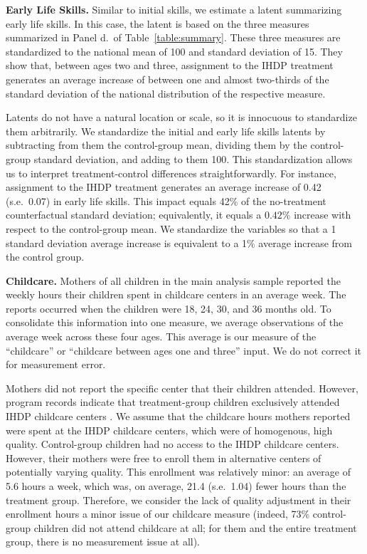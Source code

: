 \noindent \textbf{Early Life Skills.} Similar to initial skills, we estimate a latent summarizing early life skills. In this case, the latent is based on the three measures summarized in Panel d.\ of Table~\ref{table:summary}. These three measures are standardized to the national mean of 100 and standard deviation of 15. They show that, between ages two and three, assignment to the IHDP treatment generates an average increase of between one and almost two-thirds of the standard deviation of the national distribution of the respective measure. 

Latents do not have a natural location or scale, so it is innocuous to standardize them arbitrarily. We standardize the initial and early life skills latents by subtracting from them the control-group mean, dividing them by the control-group standard deviation, and adding to them 100. This standardization allows us to interpret treatment-control differences straightforwardly. For instance, assignment to the IHDP treatment generates an average increase of 0.42 (s.e.\ 0.07) in early life skills. This impact equals 42\% of the no-treatment counterfactual standard deviation; equivalently, it equals a $0.42\%$ increase with respect to the control-group mean. We standardize the variables so that a 1 standard deviation average increase is equivalent to a 1\% average increase from the control group.

\noindent \textbf{Childcare.} Mothers of all children in the main analysis sample reported the weekly hours their children spent in childcare centers in an average week. The reports occurred when the children were 18, 24, 30, and 36 months old. To consolidate this information into one measure, we average observations of the average week across these four ages. This average is our measure of the ``childcare'' or ``childcare between ages one and three'' input. We do not correct it for measurement error.

Mothers did not report the specific center that their children attended. However, program records indicate that treatment-group children exclusively attended IHDP childcare centers \citep{gross1997helping}. We assume that the childcare hours mothers reported were spent at the IHDP childcare centers, which were of homogenous, high quality. Control-group children had no access to the IHDP childcare centers. However, their mothers were free to enroll them in alternative centers of potentially varying quality. This enrollment was relatively minor: an average of 5.6 hours a week, which was, on average, 21.4 (s.e.\ 1.04) fewer hours than the treatment group. Therefore, we consider the lack of quality adjustment in their enrollment hours a minor issue of our childcare measure (indeed, 73\% control-group children did not attend childcare at all; for them and the entire treatment group, there is no measurement issue at all). 

